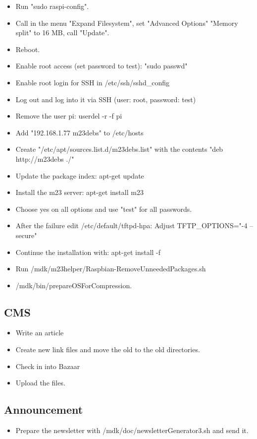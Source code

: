 \begin{itemize}
\begin{itemize}
		\item Run "sudo raspi-config".
		\item Call in the menu "Expand Filesystem", set "Advanced Options" "Memory split" to 16 MB, call "Update".
		\item Reboot.
		\item Enable root access (set password to test): "sudo passwd"
		\item Enable root login for SSH in /etc/ssh/sshd_config
		\item Log out and log into it via SSH (user: root, password: test)
		\item Remove the user pi: userdel -r -f pi
		\item Add "192.168.1.77 m23debs" to /etc/hosts
		\item Create "/etc/apt/sources.list.d/m23debs.list" with the contents "deb http://m23debs ./"
		\item Update the package index: apt-get update
		\item Install the m23 server: apt-get install m23
		\item Choose yes on all options and use "test" for all passwords.
		\item After the failure edit /etc/default/tftpd-hpa: Adjust TFTP_OPTIONS="-4 --secure"
		\item Continue the installation with: apt-get install -f
		\item Run /mdk/m23helper/Raspbian-RemoveUnneededPackages.sh
		\item /mdk/bin/prepareOSForCompression.
	\end{itemize}
\end{itemize}


\subsection{CMS}
\begin{itemize}
	\item Write an article
	\item Create new link files and move the old to the old directories.
	\item Check in into Bazaar
	\item Upload the files.
\end{itemize}


\subsection{Announcement}
\begin{itemize}
	\item Prepare the newsletter with /mdk/doc/newsletterGenerator3.sh and send it.
\end{itemize}